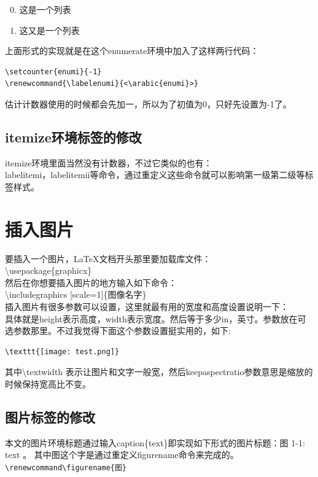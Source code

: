 \documentclass[11pt,oneside]{book}
\begin{document}
\begin{enumerate}
\setcounter{enumi}{-1}
\renewcommand{\labelenumi}{<\arabic{enumi}>}
\item 这是一个列表
\item 这又是一个列表
\end{enumerate}

上面形式的实现就是在这个enumerate环境中加入了这样两行代码：
\begin{Verbatim}
\setcounter{enumi}{-1}
\renewcommand{\labelenumi}{<\arabic{enumi}>}
\end{Verbatim}
估计计数器使用的时候都会先加一，所以为了初值为0，只好先设置为-1了。

\section{itemize环境标签的修改}
itemize环境里面当然没有计数器，不过它类似的也有：\\ labelitemi，labelitemii等命令，通过重定义这些命令就可以影响第一级第二级等标签样式。








\chapter{插入图片}
要插入一个图片，\LaTeX 文档开头那里要加载库文件：\\
\textbackslash usepackage\{graphicx\}\\
然后在你想要插入图片的地方输入如下命令：\\
\textbackslash includegraphics [scale=1]\{图像名字\}\\
插入图片有很多参数可以设置，这里就最有用的宽度和高度设置说明一下：\\
具体就是height表示高度，width表示宽度。然后等于多少in，英寸。参数放在可选参数那里。不过我觉得下面这个参数设置挺实用的，如下:
\begin{Verbatim}
\texttt{[image: test.png]}
\end{Verbatim}
其中\textbackslash textwidth 表示让图片和文字一般宽，然后keepaspectratio参数意思是缩放的时候保持宽高比不变。

\section{图片标签的修改}
\label{sec:图片标签的修改}
本文的图片环境标题通过输入caption\{text\}即实现如下形式的图片标题：图 1-1: text  。
其中图这个字是通过重定义figurename命令来完成的。\\
\verb+\renewcommand\figurename{图}+
\end{document}
